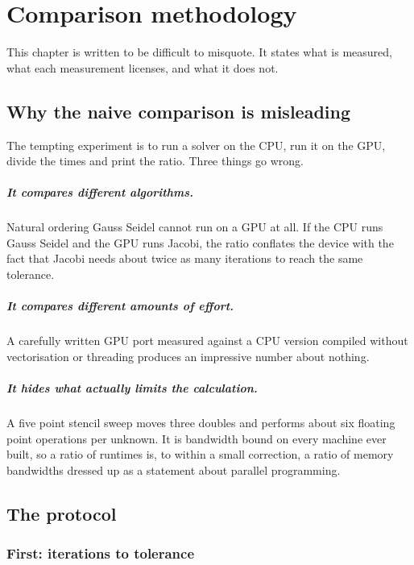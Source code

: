 \chapter{Comparison methodology}
\label{ch:methodology}

This chapter is written to be difficult to misquote. It states what is measured,
what each measurement licenses, and what it does not.

\section{Why the naive comparison is misleading}

The tempting experiment is to run a solver on the CPU, run it on the GPU, divide
the times and print the ratio. Three things go wrong.

\paragraph{It compares different algorithms.} Natural ordering Gauss Seidel
cannot run on a GPU at all. If the CPU runs Gauss Seidel and the GPU runs
Jacobi, the ratio conflates the device with the fact that Jacobi needs about
twice as many iterations to reach the same tolerance.

\paragraph{It compares different amounts of effort.} A carefully written GPU port
measured against a CPU version compiled without vectorisation or threading
produces an impressive number about nothing.

\paragraph{It hides what actually limits the calculation.} A five point stencil
sweep moves three doubles and performs about six floating point operations per
unknown. It is bandwidth bound on every machine ever built, so a ratio of
runtimes is, to within a small correction, a ratio of memory bandwidths dressed
up as a statement about parallel programming.

\section{The protocol}

\subsection{First: iterations to tolerance}

